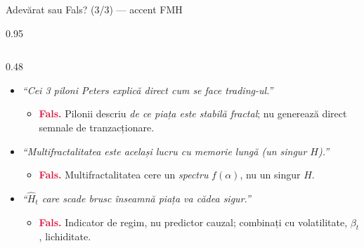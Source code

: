 \documentclass[9pt, aspectratio=169, t]{beamer}
\begin{document}
\begin{frame}[shrink=25]{Adevărat sau Fals? (3/3) --- accent FMH}
\begin{cminipage}{0.95\textwidth}
\begin{columns}[T]
\begin{column}{0.48\textwidth}
\begin{itemize}
\begin{itemize}
    \end{itemize}
    \item \textit{``Cei 3 piloni Peters explică direct cum se face trading-ul.''}
    \begin{itemize}\setlength{\itemsep}{0pt}
        \item[] \textcolor{Crimson}{\textbf{Fals.}} Pilonii descriu \emph{de ce piața este stabilă fractal}; nu generează direct semnale de tranzacționare.
    \end{itemize}
    \item \textit{``Multifractalitatea este același lucru cu memorie lungă (un singur $H$).''}
    \begin{itemize}\setlength{\itemsep}{0pt}
        \item[] \textcolor{Crimson}{\textbf{Fals.}} Multifractalitatea cere un \emph{spectru} $f(\alpha)$, nu un singur $H$.
    \end{itemize}
    \item \textit{``$\hat H_t$ care scade brusc înseamnă piața va cădea sigur.''}
    \begin{itemize}\setlength{\itemsep}{0pt}
        \item[] \textcolor{Crimson}{\textbf{Fals.}} Indicator de regim, nu predictor cauzal; combinați cu volatilitate, $\beta_t$, lichiditate.
    \end{itemize}
\end{itemize}
\end{column}
\end{columns}
\end{cminipage}
\end{frame}
\end{document}
